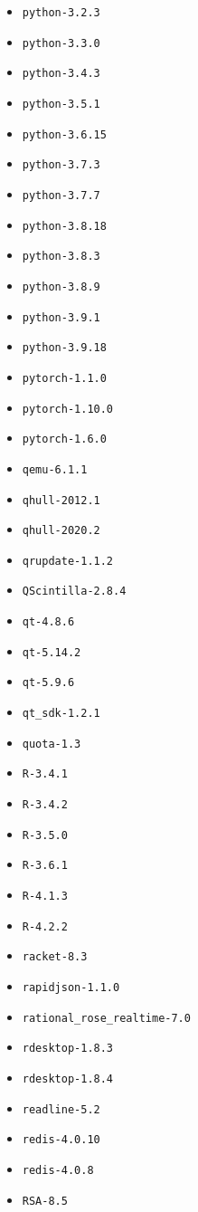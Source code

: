 \begin{multicols}{3}
\begin{itemize}
\item \verb|python-3.2.3|
\item \verb|python-3.3.0|
\item \verb|python-3.4.3|
\item \verb|python-3.5.1|
\item \verb|python-3.6.15|
\item \verb|python-3.7.3|
\item \verb|python-3.7.7|
\item \verb|python-3.8.18|
\item \verb|python-3.8.3|
\item \verb|python-3.8.9|
\item \verb|python-3.9.1|
\item \verb|python-3.9.18|
\item \verb|pytorch-1.1.0|
\item \verb|pytorch-1.10.0|
\item \verb|pytorch-1.6.0|
\item \verb|qemu-6.1.1|
\item \verb|qhull-2012.1|
\item \verb|qhull-2020.2|
\item \verb|qrupdate-1.1.2|
\item \verb|QScintilla-2.8.4|
\item \verb|qt-4.8.6|
\item \verb|qt-5.14.2|
\item \verb|qt-5.9.6|
\item \verb|qt_sdk-1.2.1|
\item \verb|quota-1.3|
\item \verb|R-3.4.1|
\item \verb|R-3.4.2|
\item \verb|R-3.5.0|
\item \verb|R-3.6.1|
\item \verb|R-4.1.3|
\item \verb|R-4.2.2|
\item \verb|racket-8.3|
\item \verb|rapidjson-1.1.0|
\item \verb|rational_rose_realtime-7.0|
\item \verb|rdesktop-1.8.3|
\item \verb|rdesktop-1.8.4|
\item \verb|readline-5.2|
\item \verb|redis-4.0.10|
\item \verb|redis-4.0.8|
\item \verb|RSA-8.5|

\end{itemize}
\end{multicols}
